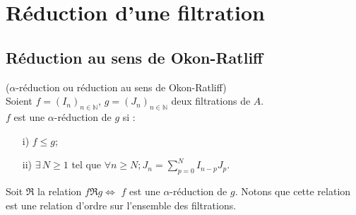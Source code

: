 \section{Réduction d'une filtration}
\subsection{Réduction au sens de Okon-Ratliff}
\begin{madefinition}
	($\alpha$-réduction ou réduction au sens de Okon-Ratliff)\\
	Soient $f=(I_n)_{n \in \mathbb{N}}$, $g=(J_n)_{n \in \mathbb{N}}$ deux filtrations de $A$.\\
	$f$ est une $\alpha$-réduction de $g$ si : \\
	\begin{enumerate}
		\item[i)] $f \leq g$;
		\item[ii)] $\exists \, N \geq 1$ tel que $\forall n \geq N ; J_n = \displaystyle \sum_{p=0}^{N}{I_{n-p} J_p}$.
	\end{enumerate}
\end{madefinition}
\begin{maremarque}
	Soit $\Re$ la relation $f \Re g \Leftrightarrow$ $f$ est une $\alpha$-réduction de $g$. Notons que cette relation est une relation d'ordre sur l'ensemble des filtrations.	
\end{maremarque}

